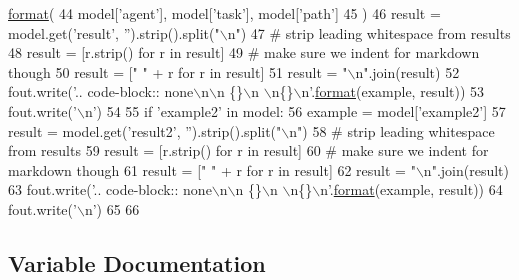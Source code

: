 \begin{DoxyCode}
      \hyperlink{namespaceparlai_1_1chat__service_1_1services_1_1messenger_1_1shared__utils_a32e2e2022b824fbaf80c747160b52a76}{format}(
44             model[\textcolor{stringliteral}{'agent'}], model[\textcolor{stringliteral}{'task'}], model[\textcolor{stringliteral}{'path'}]
45         )
46     result = model.get(\textcolor{stringliteral}{'result'}, \textcolor{stringliteral}{''}).strip().split(\textcolor{stringliteral}{"\(\backslash\)n"})
47     \textcolor{comment}{# strip leading whitespace from results}
48     result = [r.strip() \textcolor{keywordflow}{for} r \textcolor{keywordflow}{in} result]
49     \textcolor{comment}{# make sure we indent for markdown though}
50     result = [\textcolor{stringliteral}{"   "} + r \textcolor{keywordflow}{for} r \textcolor{keywordflow}{in} result]
51     result = \textcolor{stringliteral}{"\(\backslash\)n"}.join(result)
52     fout.write(\textcolor{stringliteral}{'.. code-block:: none\(\backslash\)n\(\backslash\)n   \{\}\(\backslash\)n   \(\backslash\)n\{\}\(\backslash\)n'}.\hyperlink{namespaceparlai_1_1chat__service_1_1services_1_1messenger_1_1shared__utils_a32e2e2022b824fbaf80c747160b52a76}{format}(example, result))
53     fout.write(\textcolor{stringliteral}{'\(\backslash\)n'})
54 
55     \textcolor{keywordflow}{if} \textcolor{stringliteral}{'example2'} \textcolor{keywordflow}{in} model:
56         example = model[\textcolor{stringliteral}{'example2'}]
57         result = model.get(\textcolor{stringliteral}{'result2'}, \textcolor{stringliteral}{''}).strip().split(\textcolor{stringliteral}{"\(\backslash\)n"})
58         \textcolor{comment}{# strip leading whitespace from results}
59         result = [r.strip() \textcolor{keywordflow}{for} r \textcolor{keywordflow}{in} result]
60         \textcolor{comment}{# make sure we indent for markdown though}
61         result = [\textcolor{stringliteral}{"   "} + r \textcolor{keywordflow}{for} r \textcolor{keywordflow}{in} result]
62         result = \textcolor{stringliteral}{"\(\backslash\)n"}.join(result)
63         fout.write(\textcolor{stringliteral}{'.. code-block:: none\(\backslash\)n\(\backslash\)n   \{\}\(\backslash\)n   \(\backslash\)n\{\}\(\backslash\)n'}.\hyperlink{namespaceparlai_1_1chat__service_1_1services_1_1messenger_1_1shared__utils_a32e2e2022b824fbaf80c747160b52a76}{format}(example, result))
64         fout.write(\textcolor{stringliteral}{'\(\backslash\)n'})
65 
66 
\end{DoxyCode}


\subsection{Variable Documentation}
\mbox{\label{namespacegenerate__zoo__list_a5fcda76c48a176fc2daa0d12a9602f49}} 
